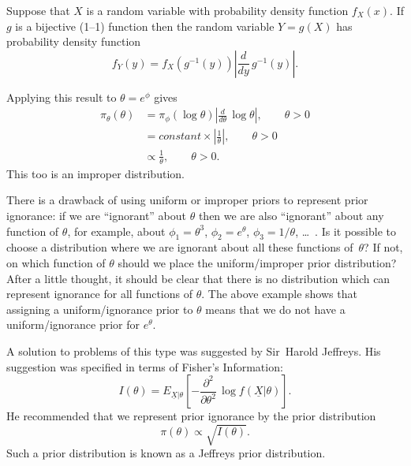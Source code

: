 Suppose that $X$ is a random variable with probability density function $f_X(x)$. If $g$ is a bijective (1--1) function then the random variable $Y=g(X)$ has probability density function
\begin{equation}
\label{eq:p14}
f_Y(y)=f_X\left(g^{-1}(y)\right)\left|\frac{d}{dy}\,g^{-1}(y)\right|.
\end{equation}

Applying this result to $\theta=e^\phi$ gives
\begin{align*}
\pi_\theta(\theta)
&=\pi_\phi(\log\theta)\left|\frac{d}{d\theta}\,\log\theta\right|,
\quad\quad\theta>0 \\
&=constant\times\left|\frac{1}{\theta}\right|,\quad\quad\theta>0 \\
&\propto\frac{1}{\theta},\quad\quad\theta>0.
\end{align*}
This too is an improper distribution.

There is a drawback of using uniform or improper priors to represent prior ignorance: if we are ``ignorant'' about $\theta$ then we are also ``ignorant'' about any function of $\theta$, for example, about
$\phi_1=\theta^3$, $\phi_2=e^\theta$, $\phi_3=1/\theta$,
\ldots~. Is it possible to choose a distribution where we are ignorant about all these functions of~$\theta$? If not, on which function of $\theta$ should we place the uniform/improper prior distribution? After a little thought, it should be clear that there is no distribution which can represent ignorance for all functions of $\theta$. The above example shows that assigning a uniform/ignorance prior to $\theta$ means that we do not have a uniform/ignorance prior for $e^\theta$.

A solution to problems of this type was suggested by Sir~Harold Jeffreys. His suggestion was specified in terms of Fisher's Information:
\begin{equation}
\label{eq:fisher}
I(\theta)=E_{\underline{X}|\theta}\left[-
\frac{\partial^2}{\partial\theta^{2}}\,
\log f(\underline{X}|\theta)\right].
\end{equation}
He recommended that we represent prior ignorance by the prior distribution
\begin{equation}
\pi(\theta)\propto \sqrt{I(\theta)}.
\end{equation}
Such a prior distribution is known as a Jeffreys prior distribution.

